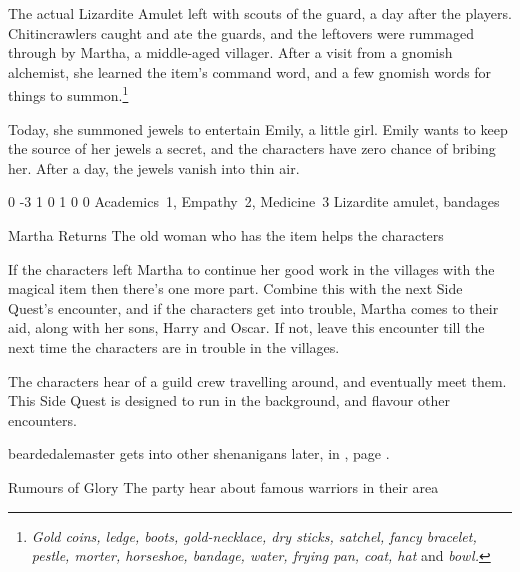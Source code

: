 \begin{multicols}{2}
The actual Lizardite Amulet left with scouts of the \gls{guard}, a day after the players.
Chitincrawlers caught and ate the guards, and the leftovers were rummaged through by Martha, a middle-aged villager.
After a visit from a gnomish alchemist, she learned the item's command word, and a few gnomish words for things to summon.\footnote
{\textit{Gold coins, ledge, boots, gold-necklace, dry sticks, satchel, fancy bracelet, pestle, morter, horseshoe, bandage, water, frying pan, coat, hat} and \textit{bowl.}}

Today, she summoned jewels to entertain Emily, a little girl.
Emily wants to keep the source of her jewels a secret, and the characters have zero chance of bribing her.
After a day, the jewels vanish into thin air.


  {0}%
  {-3}%
  {{1}%
  {0}%
  {1}}%
  {0}%
  {0}%
  {Academics~1, Empathy~2, Medicine~3}%
  {Lizardite amulet, bandages}%
  {}

{\squash Martha Returns}%
{The old woman who has the item helps the characters}%

If the characters left Martha to continue her good work in the villages with the magical item then there's one more part.
Combine this with the next Side Quest's encounter, and if the characters get into trouble, Martha comes to their aid, along with her sons, Harry and Oscar.
If not, leave this encounter till the next time the characters are in trouble in the villages.


\stopcontents[sq]

\resumecontents[Forest]
\resumecontents[Villages]
\stopcontents[Forest]
\stopcontents[Villages]

\startcontents[sq]

\sqminitoc

\noindent
The characters hear of a guild crew travelling around, and eventually meet them.
This Side Quest is designed to run in the background, and flavour other encounters.

\Gls{beardedalemaster} gets into other shenanigans later, in , page \pageref{troubleAle}.

{\N \squash Rumours of Glory}%
{The party hear about famous warriors in their area}%


\end{multicols}
